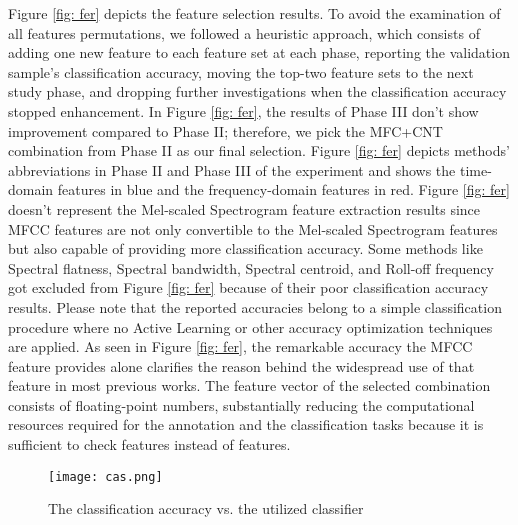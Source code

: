 \documentclass{article}
\begin{document}
Figure \ref{fig: fer} depicts the feature selection results. To avoid the examination of all features permutations, we followed a heuristic approach, which consists of adding one new feature to each feature set at each phase, reporting the validation sample's classification accuracy, moving the top-two feature sets to the next study phase, and dropping further investigations when the classification accuracy stopped enhancement. In Figure \ref{fig: fer}, the results of Phase III don't show improvement compared to Phase II; therefore, we pick the MFC+CNT combination from Phase II as our final selection. Figure \ref{fig: fer} depicts methods' abbreviations in Phase II and Phase III of the experiment and shows the time-domain features in blue and the frequency-domain features in red. Figure \ref{fig: fer} doesn't represent the Mel-scaled Spectrogram feature extraction results since MFCC features are not only convertible to the Mel-scaled Spectrogram features but also capable of providing more classification accuracy. Some methods like Spectral flatness, Spectral bandwidth, Spectral centroid, and Roll-off frequency got excluded from Figure \ref{fig: fer} because of their poor classification accuracy results. Please note that the reported accuracies belong to a simple classification procedure where no Active Learning or other accuracy optimization techniques are applied. As seen in Figure \ref{fig: fer}, the remarkable accuracy the MFCC feature provides alone clarifies the reason behind the widespread use of that feature in most previous works. The feature vector of the selected combination consists of  floating-point numbers, substantially reducing the computational resources required for the annotation and the classification tasks because it is sufficient to check  features instead of  features. 

\begin{figure}
	\centering	
	\texttt{[image: cas.png]}  		
	\caption{The classification accuracy vs. the utilized classifier}
	\label{fig: cas}
\end{figure}
\end{document}
